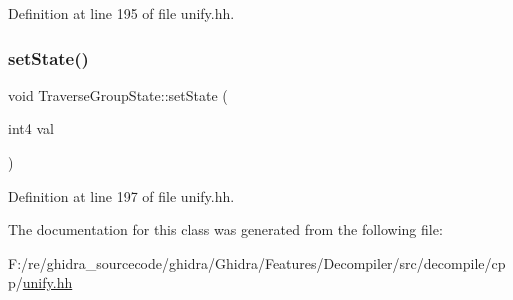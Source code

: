 Definition at line 195 of file unify.\+hh.

\mbox{\label{class_traverse_group_state_a6d4c89aea1bb414859c86cac2b7ee11c}} 
\subsubsection{\texorpdfstring{setState()}{setState()}}
{\footnotesize\ttfamily void Traverse\+Group\+State\+::set\+State (\begin{DoxyParamCaption}\item[{int4}]{val }\end{DoxyParamCaption})\hspace{0.3cm}{\ttfamily [inline]}}



Definition at line 197 of file unify.\+hh.



The documentation for this class was generated from the following file\+:\begin{DoxyCompactItemize}
\item 
F\+:/re/ghidra\+\_\+sourcecode/ghidra/\+Ghidra/\+Features/\+Decompiler/src/decompile/cpp/\mbox{\hyperlink{unify_8hh}{unify.\+hh}}\end{DoxyCompactItemize}
